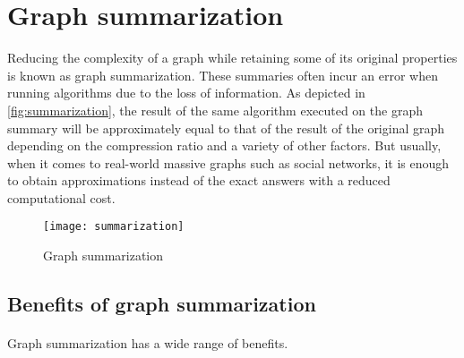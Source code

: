 \section{Graph summarization}

Reducing the complexity of a graph while retaining some of its original properties is known as graph summarization. These summaries often incur an error when running algorithms due to the loss of information. As depicted in \autoref{fig:summarization}, the result of the same algorithm executed on the graph summary will be approximately equal to that of the result of the original graph depending on the compression ratio and a variety of other factors. But usually, when it comes to real-world massive graphs such as social networks, it is enough to obtain approximations instead of the exact answers with a reduced computational cost.

\begin{figure}[H]
    \centering \texttt{[image: summarization]}
    \caption{Graph summarization}
    \label{fig:summarization}
\end{figure}

\subsection{Benefits of graph summarization}

\paragraph{}
Graph summarization has a wide range of benefits\cite{liu_graph_2018}.

